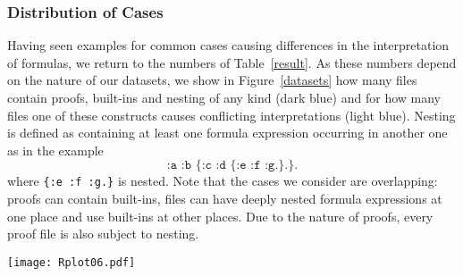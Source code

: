 \subsubsection{Distribution of Cases}\label{cases}
Having seen examples for common cases causing differences in the interpretation of \nthree formulas, we return to the numbers of Table~\ref{result}.
As these numbers depend on the nature of our datasets, we show in Figure~\ref{datasets} how many files contain proofs, built-ins and nesting of any kind (dark blue)
and for how many files one of these constructs causes conflicting interpretations (light blue).
Nesting is defined as containing at least one formula expression occurring in another one as in the example
\[\texttt{:a :b \{:c :d \{:e :f :g.\}.\}.}\]
where \texttt{\{:e :f :g.\}} is nested.
Note that the cases we consider are overlapping: proofs can contain built-ins, 
files can have deeply nested formula expressions at one place and use built-ins at other places. Due to the nature of proofs, every proof file is also subject to nesting. 
\begin{figure*}
 \texttt{[image: Rplot06.pdf]}
 \caption{Distributions of proofs, built-ins and nesting in datasets. The share in dark blue always represents the files containing the respective feature while light blue is used to represent the cases
 where the feature leads to different interpretations.\label{datasets}}
\end{figure*}

